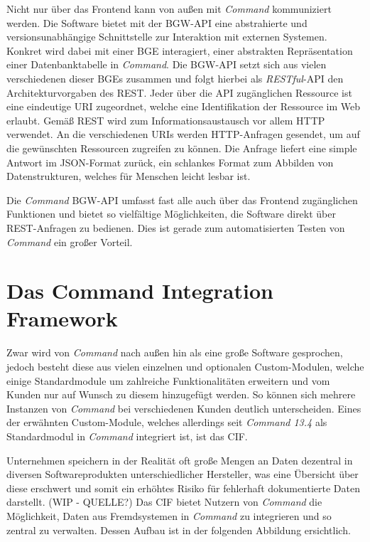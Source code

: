 Nicht nur über das Frontend kann von außen mit \textit{Command} kommuniziert werden. Die Software bietet mit der \ac{BGW}-\ac{API} eine abstrahierte und versionsunabhängige Schnittstelle zur Interaktion mit externen Systemen. Konkret wird dabei mit einer \ac{BGE} interagiert, einer abstrakten Repräsentation einer Datenbanktabelle in \textit{Command}. Die \ac{BGW}-\ac{API} setzt sich aus vielen verschiedenen dieser \ac{BGE}s zusammen und folgt hierbei als \textit{RESTful}-\ac{API} den Architekturvorgaben des \ac{REST}. Jeder über die \ac{API} zugänglichen Ressource ist eine eindeutige \ac{URI} zugeordnet, welche eine Identifikation der Ressource im Web erlaubt. \cite{berners:2005} Gemäß \ac{REST} wird zum Informationsaustausch vor allem \ac{HTTP} verwendet. An die verschiedenen \ac{URI}s werden \ac{HTTP}-Anfragen gesendet, um auf die gewünschten Ressourcen zugreifen zu können. \cite{kalin:2013} Die Anfrage liefert eine simple Antwort im \ac{JSON}-Format zurück, ein schlankes Format zum Abbilden von Datenstrukturen, welches für Menschen leicht lesbar ist. \cite[S. 266.]{richardson:2008} 

Die \textit{Command} \ac{BGW}-\ac{API} umfasst fast alle auch über das Frontend zugänglichen Funktionen und bietet so vielfältige Möglichkeiten, die Software direkt über \ac{REST}-Anfragen zu bedienen. Dies ist gerade zum automatisierten Testen von \textit{Command} ein großer Vorteil.


\section{Das Command Integration Framework}\label{sec:cif}
Zwar wird von \textit{Command} nach außen hin als eine große Software gesprochen, jedoch besteht diese aus vielen einzelnen und optionalen Custom-Modulen, welche einige Standardmodule um zahlreiche Funktionalitäten erweitern und vom Kunden nur auf Wunsch zu diesem hinzugefügt werden. So können sich mehrere Instanzen von \textit{Command} bei verschiedenen Kunden deutlich unterscheiden. Eines der erwähnten Custom-Module, welches allerdings seit \textit{Command 13.4} als Standardmodul in \textit{Command} integriert ist, ist das \acf{CIF}.

Unternehmen speichern in der Realität oft große Mengen an Daten dezentral in diversen Softwareprodukten unterschiedlicher Hersteller, was eine Übersicht über diese erschwert und somit ein erhöhtes Risiko für fehlerhaft dokumentierte Daten darstellt. (WIP - QUELLE?) Das \ac{CIF} bietet Nutzern von \textit{Command} die Möglichkeit, Daten aus Fremdsystemen in \textit{Command} zu integrieren und so zentral zu verwalten. Dessen Aufbau ist in der folgenden Abbildung ersichtlich.

